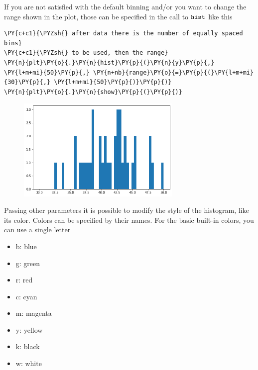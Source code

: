 If you are not satisfied with the default binning and/or you want to
change the range shown in the plot, those can be specified in the call
to \(\tt{hist}\) like this

\begin{tcolorbox}[breakable, size=fbox, boxrule=1pt, pad at break*=1mm,colback=cellbackground, colframe=cellborder]
\begin{Verbatim}[commandchars=\\\{\}]
\PY{c+c1}{\PYZsh{} after data there is the number of equally spaced bins}
\PY{c+c1}{\PYZsh{} to be used, then the range}
\PY{n}{plt}\PY{o}{.}\PY{n}{hist}\PY{p}{(}\PY{n}{y}\PY{p}{,} \PY{l+m+mi}{50}\PY{p}{,} \PY{n+nb}{range}\PY{o}{=}\PY{p}{(}\PY{l+m+mi}{30}\PY{p}{,} \PY{l+m+mi}{50}\PY{p}{)}\PY{p}{)}
\PY{n}{plt}\PY{o}{.}\PY{n}{show}\PY{p}{(}\PY{p}{)}
\end{Verbatim}
\end{tcolorbox}

\begin{figure}[h]
	\centering
	\includegraphics[width=0.7\textwidth]{figures/matplotlib_5_0.png}
\end{figure}

Passing other parameters it is possible to modify the style of the
histogram, like its color. Colors can be specified by their names. For
the basic built-in colors, you can use a single letter

\begin{itemize}
	\tightlist
	\item
	b: blue
	\item
	g: green
	\item
	r: red
	\item
	c: cyan
	\item
	m: magenta
	\item
	y: yellow
	\item
	k: black
	\item
	w: white
\end{itemize}

